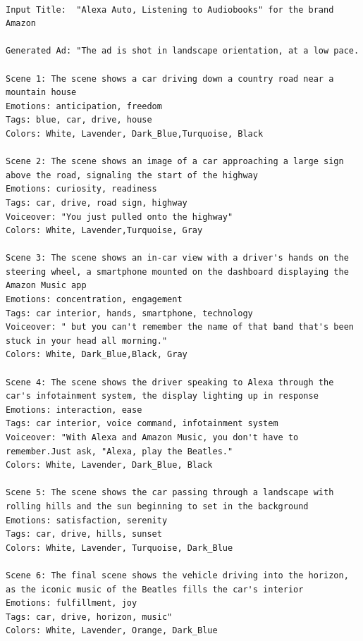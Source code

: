 \begin{lstlisting}[caption={Advertisement generated by Henry-SEED for an Amazon ad. Original Ad: \url{https://www.youtube.com/watch?v=rcFTqs-zSH4}},frame=single,breaklines=true,basicstyle=\tiny,label={lst:amazon}]

Input Title:  "Alexa Auto, Listening to Audiobooks" for the brand Amazon

Generated Ad: "The ad is shot in landscape orientation, at a low pace.

Scene 1: The scene shows a car driving down a country road near a mountain house
Emotions: anticipation, freedom
Tags: blue, car, drive, house
Colors: White, Lavender, Dark_Blue,Turquoise, Black

Scene 2: The scene shows an image of a car approaching a large sign above the road, signaling the start of the highway
Emotions: curiosity, readiness
Tags: car, drive, road sign, highway
Voiceover: "You just pulled onto the highway"
Colors: White, Lavender,Turquoise, Gray

Scene 3: The scene shows an in-car view with a driver's hands on the steering wheel, a smartphone mounted on the dashboard displaying the Amazon Music app
Emotions: concentration, engagement
Tags: car interior, hands, smartphone, technology
Voiceover: " but you can't remember the name of that band that's been stuck in your head all morning."
Colors: White, Dark_Blue,Black, Gray

Scene 4: The scene shows the driver speaking to Alexa through the car's infotainment system, the display lighting up in response
Emotions: interaction, ease
Tags: car interior, voice command, infotainment system
Voiceover: "With Alexa and Amazon Music, you don't have to remember.Just ask, "Alexa, play the Beatles."
Colors: White, Lavender, Dark_Blue, Black

Scene 5: The scene shows the car passing through a landscape with rolling hills and the sun beginning to set in the background
Emotions: satisfaction, serenity
Tags: car, drive, hills, sunset
Colors: White, Lavender, Turquoise, Dark_Blue

Scene 6: The final scene shows the vehicle driving into the horizon, as the iconic music of the Beatles fills the car's interior
Emotions: fulfillment, joy
Tags: car, drive, horizon, music"
Colors: White, Lavender, Orange, Dark_Blue
\end{lstlisting}




